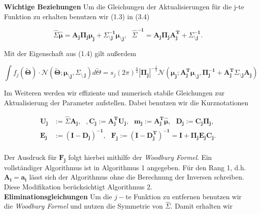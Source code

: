 \documentclass[12pt,a4paper]{scrartcl}
\numberwithin{equation}{section}
\begin{document}
\textbf{Wichtige Beziehungen } Um die Gleichungen der Aktualisierungen für die j-te Funktion zu erhalten benutzen wir
(1.3) in (3.4)

\begin{equation}
 \mathbf{\hat \varSigma \hat \mu = A_j \Pi_j \mu_j + \varSigma^{-1}_{\setminus j} \mu_{\setminus j}}, \text{	} \mathbf{\hat \varSigma^{-1} = A_j \Pi_j A_j^T + \varSigma_{\setminus j}^{-1}}. 
\end{equation}

Mit der Eigenschaft aus (1.4) gilt außerdem 

\begin{equation}
 \int f_j(\mathbf{ \tilde \Theta}) \cdot \mathcal{N}(\mathbf{\tilde \Theta; \mu_{ \setminus j}, \varSigma_{\setminus\ j}}) d \tilde \Theta = s_j (2 \pi)^{\frac{n}{2}} |\mathbf{\Pi_j}|^{-\frac{1}{2}} \mathcal{N}(\mathbf{\mu_j; A_j^T \mu_{\setminus j}, \Pi_j^{-1} + A_j^T \varSigma_{\setminus j} A_j})
\end{equation}

Im Weiteren werden wir effiziente und numerisch stabile Gleichungen zur Aktualisierung der Parameter aufstellen. 
Dabei benutzen wir die Kurznotationen

\begin{equation}
 \begin{split}
 \mathbf{U_j} &:= \mathbf{\hat \varSigma A_j}, \text{	}, \mathbf{C_j := A_j^T U_j}, \text{	} \mathbf{m_j := A_j^T \hat \mu}, \text{	} \mathbf{D_j:= C_j \Pi_j ,} \\
 \mathbf{ E_j}  &:= \mathbf{(I- D_j)^{-1}} , \text{		} \mathbf{F_j := (I-D_j^T)^{-1} = I + \Pi_j E_j C_j  } . \\
 \end{split}
 \end{equation}

Der Ausdruck für $\mathbf{F_j}$ folgt hierbei mithilfe der \textit{Woodbury Formel}. Ein vollständiger Algorithmus ist in Algorithmus 1 angegeben. 
Für den Rang 1, d.h. $\mathbf{A_i = a_i}$ lässt sich der Algorithmus ohne die Berechnung der Inversen schreiben. Diese Modifikation berücksichtigt
Algorithmus 2. \\

\textbf{Eliminationsgleichungen	} Um die $j-$te Funktion zu entfernen benutzen wir die \textit{Woodbury Formel} und nutzen die Symmetrie
von $\hat \varSigma$. Damit erhalten wir 
\end{document}
